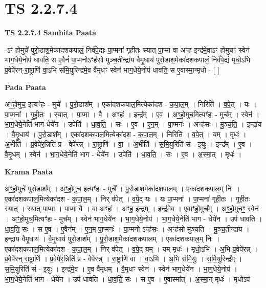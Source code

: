 \documentclass[17pt]{extarticle}
\begin{document}
\section*{ TS 2.2.7.4 }

\textbf{TS 2.2.7.4 } \newline
\textbf{Samhita Paata} \newline

-ऽꣳ हो॒मुचे॑ पुरो॒डाश॒मेका॑दशकपालं॒ निर्व॑पे॒द्यः पा॒प्मना॑ गृही॒तः स्यात् पा॒प्मा वा अꣳह॒ इन्द्र॑मे॒वाऽꣳ हो॒मुचꣳ॒॒ स्वेन॑ भाग॒धेये॒नोप॑ धावति॒ स ए॒वैनं॑ पा॒प्मनोऽꣳह॑सो मुञ्च॒तीन्द्रा॑य वैमृ॒धाय॑ पुरो॒डाश॒मेका॑दशकपालं॒ निर्व॑पे॒द्यं मृधो॒ऽभि प्र॒वेपे॑रन्-रा॒ष्ट्राणि॑ वा॒ऽभि स॑मि॒युरिन्द्र॑मे॒व वै॑मृ॒धꣳ स्वेन॑ भाग॒धेये॒नोप॑ धावति॒ स ए॒वास्मा॒न्मृधो - [  ] \newline

\textbf{Pada Paata} \newline

अꣳ॒॒हो॒मुच॒ इत्यꣳ॑हः - मुचे᳚ । पु॒रो॒डाश᳚म् । एका॑दशकपाल॒मित्येका॑दश - क॒पा॒ल॒म् । निरिति॑ । व॒पे॒त् । यः । पा॒प्मना᳚ । गृ॒ही॒तः । स्यात् । पा॒प्मा । वै । अꣳहः॑ । इन्द्र᳚म् । ए॒व । अꣳ॒॒हो॒मुच॒मित्यꣳ॑हः - मुच᳚म् । स्वेन॑ । भा॒ग॒धेये॒नेति॑ भाग-धेये॑न । उपेति॑ । धा॒व॒ति॒ । सः । ए॒व । ए॒न॒म् । पा॒प्मनः॑ । अꣳह॑सः । मु॒ञ्च॒ति॒ । इन्द्रा॑य । वै॒मृ॒धाय॑ । पु॒रो॒डाश᳚म् । एका॑दशकपाल॒मित्येका॑दश - क॒पा॒ल॒म् । निरिति॑ । व॒पे॒त् । यम् । मृधः॑ । अ॒भीति॑ । प्र॒वेपे॑र॒न्निति॑ प्र - वेपे॑रन्न् । रा॒ष्ट्राणि॑ । वा॒ । अ॒भीति॑ । स॒मि॒युरिति॑ सं - इ॒युः । इन्द्र᳚म् । ए॒व । वै॒मृ॒धम् । स्वेन॑ । भा॒ग॒धेये॒नेति॑ भाग - धेये॑न । उपेति॑ । धा॒व॒ति॒ । सः । ए॒व । अ॒स्मा॒त् । मृधः॑ ।  \newline


\textbf{Krama Paata} \newline

अꣳ॒॒हो॒मुचे॑ पुरो॒डाश᳚म् । अꣳ॒॒हो॒मुच॒ इत्यꣳ॑हः - मुचे᳚ । पु॒रो॒डाश॒मेका॑दशपालम् । एका॑दशकपाल॒म् निः । एका॑दशकपाल॒मित्येका॑दश - क॒पा॒ल॒म् । निर् व॑पेत् । व॒पे॒द् यः । यः पा॒प्मना᳚ । पा॒प्मना॑ गृही॒तः । गृ॒ही॒तः स्यात् । स्यात् पा॒प्मा । पा॒प्मा वै । वा अꣳहः॑ । अꣳह॒ इन्द्र᳚म् । इन्द्र॑मे॒व । ए॒वाꣳहो॒मुच᳚म् । अꣳ॒॒हो॒मुचꣳ॒॒ स्वेन॑ । अꣳ॒॒हो॒मुच॒मित्यꣳ॑हः - मुच᳚म् । स्वेन॑ भाग॒धेये॑न । भा॒ग॒धेये॒नोप॑ । भा॒ग॒धेये॒नेति॑ भाग - धेये॑न । उप॑ धावति । धा॒व॒ति॒ सः । स ए॒व । ए॒वैन᳚म् । ए॒न॒म् पा॒प्मनः॑ । पा॒प्मनो ऽꣳह॑सः । अꣳह॑सो मुञ्चति । मु॒ञ्च॒तीन्द्रा॑य । इन्द्रा॑य वैमृ॒धाय॑ । वै॒मृ॒धाय॑ पुरो॒डाश᳚म् । पु॒रो॒डाश॒मेका॑दशकपालम् । एका॑दशकपाल॒म् निः । एका॑दशकपाल॒मित्येका॑दश - क॒पा॒ल॒म् । निर् व॑पेत् । व॒पे॒द् यम् । यम् मृधः॑ । मृधो॒ऽभि । अ॒भि प्र॒वेपे॑रन्न् । प्र॒वेपे॑रन् रा॒ष्ट्राणि॑ । प्र॒वेपे॑र॒न्निति॑ प्र - वेपे॑रन्न् । रा॒ष्ट्राणि॑ वा । वा॒ऽभि । अ॒भि स॑मि॒युः । स॒मि॒युरिन्द्र᳚म् । स॒मि॒युरिति॑ सं - इ॒युः । इन्द्र॑मे॒व । ए॒व वै॑मृ॒धम् । वै॒मृ॒धꣳ स्वेन॑ । स्वेन॑ भाग॒धेये॑न । भा॒ग॒धेये॒नोप॑ । भा॒ग॒धेये॒नेति॑ भाग - धेये॑न । उप॑ धावति । धा॒व॒ति॒ सः । स ए॒व । ए॒वास्मा᳚त् । अ॒स्मा॒न् मृधः॑ । मृधोऽप॑ \newline
\end{document}
